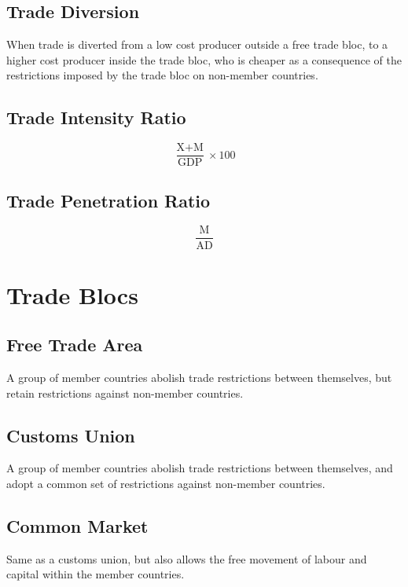 \documentclass[a4paper,11pt]{article}
\begin{document}
\subsection{Trade Diversion}

When trade is diverted from a low cost producer outside a free trade bloc, to
a higher cost producer inside the trade bloc, who is cheaper as a consequence
of the restrictions imposed by the trade bloc on non-member countries.


\subsection{Trade Intensity Ratio}

$$
\frac{\text{X} + \text{M}}{\text{GDP}} \times 100
$$


\subsection{Trade Penetration Ratio}

$$
\frac{\text{M}}{\text{AD}}
$$




\section{Trade Blocs}

\subsection{Free Trade Area}

A group of member countries abolish trade restrictions between themselves, but
retain restrictions against non-member countries.


\subsection{Customs Union}

A group of member countries abolish trade restrictions between themselves, and
adopt a common set of restrictions against non-member countries.


\subsection{Common Market}

Same as a customs union, but also allows the free movement of labour and
capital within the member countries.
\end{document}
